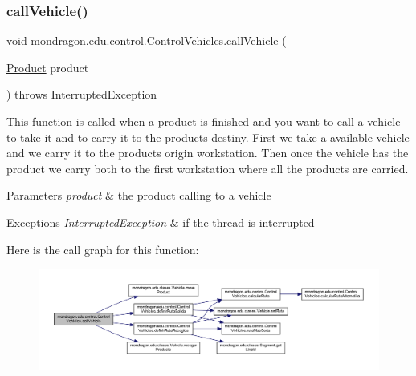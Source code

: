 \subsubsection{\texorpdfstring{callVehicle()}{callVehicle()}}
{\footnotesize\ttfamily void mondragon.\+edu.\+control.\+Control\+Vehicles.\+call\+Vehicle (\begin{DoxyParamCaption}\item[{\mbox{\hyperlink{classmondragon_1_1edu_1_1clases_1_1_product}{Product}}}]{product }\end{DoxyParamCaption}) throws Interrupted\+Exception\hspace{0.3cm}{\ttfamily [inline]}}

This function is called when a product is finished and you want to call a vehicle to take it and to carry it to the products destiny. First we take a available vehicle and we carry it to the products origin workstation. Then once the vehicle has the product we carry both to the first workstation where all the products are carried.


\begin{DoxyParams}{Parameters}
{\em product} & the product calling to a vehicle \\
\hline
\end{DoxyParams}

\begin{DoxyExceptions}{Exceptions}
{\em Interrupted\+Exception} & if the thread is interrupted \\
\hline
\end{DoxyExceptions}
Here is the call graph for this function\+:\nopagebreak
\begin{figure}[H]
\begin{center}
\leavevmode
\includegraphics[width=350pt]{classmondragon_1_1edu_1_1control_1_1_control_vehicles_ab9a26a6fd5a585bd9468a9476feaf1cf_cgraph}
\end{center}
\end{figure}
\mbox{\label{classmondragon_1_1edu_1_1control_1_1_control_vehicles_a4ea8338d43962d68e7c29bad88cfbcf3}} 
